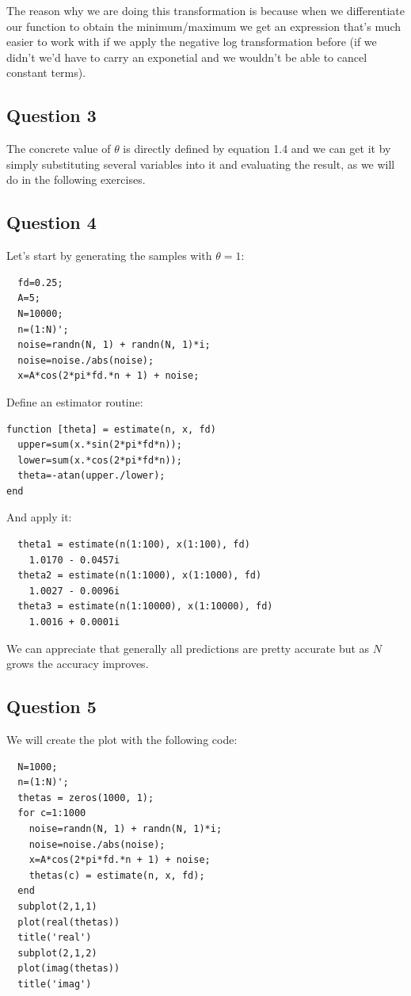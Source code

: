 \documentclass[conference,9pt]{IEEEtran}
\begin{document}
The reason why we are doing this transformation is because when we differentiate our function to obtain the minimum/maximum we get an expression that's much easier to work with if we apply the negative log transformation before (if we didn't we'd have to carry an exponetial and we wouldn't be able to cancel constant terms).

\subsection{Question 3}
The concrete value of $\theta$ is directly defined by equation 1.4 and we can get it by simply substituting several variables into it and evaluating the result, as we will do in the following exercises.

\subsection{Question 4}
Let's start by generating the samples with $\theta=1$:

\begin{verbatim}
  fd=0.25;
  A=5;
  N=10000;
  n=(1:N)';
  noise=randn(N, 1) + randn(N, 1)*i;
  noise=noise./abs(noise);
  x=A*cos(2*pi*fd.*n + 1) + noise;
\end{verbatim}

Define an estimator routine:

\begin{verbatim}
function [theta] = estimate(n, x, fd)
  upper=sum(x.*sin(2*pi*fd*n));
  lower=sum(x.*cos(2*pi*fd*n));
  theta=-atan(upper./lower);
end
\end{verbatim}

And apply it:

\begin{verbatim}
  theta1 = estimate(n(1:100), x(1:100), fd)
    1.0170 - 0.0457i
  theta2 = estimate(n(1:1000), x(1:1000), fd)
    1.0027 - 0.0096i
  theta3 = estimate(n(1:10000), x(1:10000), fd)
    1.0016 + 0.0001i
\end{verbatim}

We can appreciate that generally all predictions are pretty accurate but as $N$ grows the accuracy improves.

\subsection{Question 5}
We will create the plot with the following code:
\begin{verbatim}
  N=1000;
  n=(1:N)';
  thetas = zeros(1000, 1);
  for c=1:1000
    noise=randn(N, 1) + randn(N, 1)*i;
    noise=noise./abs(noise);
    x=A*cos(2*pi*fd.*n + 1) + noise;
    thetas(c) = estimate(n, x, fd);
  end
  subplot(2,1,1)
  plot(real(thetas))
  title('real')
  subplot(2,1,2)
  plot(imag(thetas))
  title('imag')
\end{verbatim}
\end{document}
